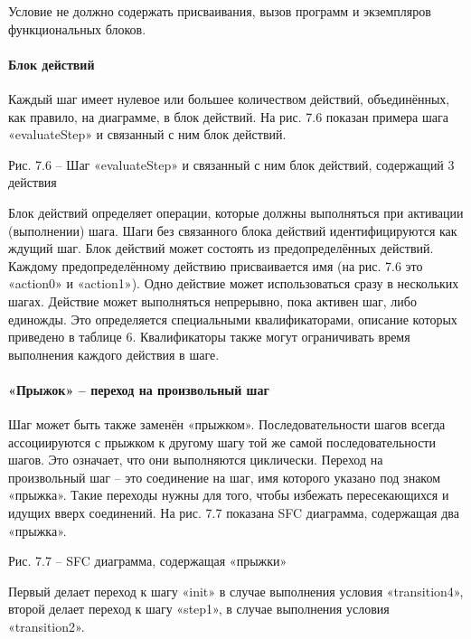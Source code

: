 \documentclass[letterpaper,10pt,russian]{sphinxmanual}
\begin{document}
Условие не должно содержать присваивания, вызов программ и экземпляров
функциональных блоков.


\paragraph{Блок действий}
\label{iec_guide/sfc_guide:id5}
Каждый шаг имеет нулевое или большее количеством действий, объединённых,
как правило, на диаграмме, в блок действий. На рис. 7.6 показан примера
шага «evaluateStep» и связанный с ним блок действий.


Рис. 7.6 – Шаг «evaluateStep» и связанный с ним блок действий,
содержащий 3 действия

Блок действий определяет операции, которые должны выполняться при
активации (выполнении) шага. Шаги без связанного блока действий
идентифицируются как ждущий шаг. Блок действий может состоять из
предопределённых действий. Каждому предопределённому действию
присваивается имя (на рис. 7.6 это «action0» и «action1»). Одно действие
может использоваться сразу в нескольких шагах. Действие может
выполняться непрерывно, пока активен шаг, либо единожды. Это
определяется специальными квалификаторами, описание которых приведено в
таблице 6. Квалификаторы также могут ограничивать время выполнения
каждого действия в шаге.


\paragraph{«Прыжок» – переход на произвольный шаг}
\label{iec_guide/sfc_guide:id6}
Шаг может быть также заменён «прыжком». Последовательности шагов всегда
ассоциируются с прыжком к другому шагу той же самой последовательности
шагов. Это означает, что они выполняются циклически. Переход на
произвольный шаг – это соединение на шаг, имя которого указано под
знаком «прыжка». Такие переходы нужны для того, чтобы избежать
пересекающихся и идущих вверх соединений. На рис. 7.7 показана SFC
диаграмма, содержащая два «прыжка».


Рис. 7.7 – SFC диаграмма, содержащая «прыжки»

Первый делает переход к шагу «init» в случае выполнения условия
«transition4», второй делает переход к шагу «step1», в случае выполнения
условия «transition2».
\end{document}
